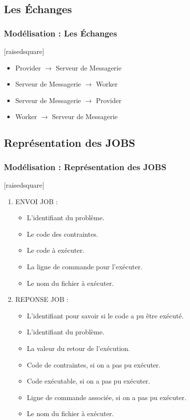 \documentclass[slidetop,11pt]{beamer}
\begin{document}
\subsection[Les Échanges]{Les Échanges}
\begin{frame}[label=echanges]
\frametitle{Modélisation : Les Échanges}

[raisedsquare]
\begin{itemize}
      \item Provider $\rightarrow$ Serveur de Messagerie
      \item Serveur de Messagerie $\rightarrow$ Worker
      \item Serveur de Messagerie $\rightarrow$ Provider
      \item Worker $\rightarrow$ Serveur de Messagerie
\end{itemize}

\end{frame}
\subsection[Représentation des JOBS]{Représentation des JOBS}
\begin{frame}[label=rep_job,fragile]
\frametitle{Modélisation : Représentation des JOBS}
[raisedsquare]
 
\begin{enumerate} \item ENVOI JOB :
\begin{itemize}
\item L'identifiant du problème.
\item Le code des contraintes.
\item Le code à exécuter.
\item La ligne de  commande pour l\textquoteright exécuter.
\item Le nom du fichier à exécuter.
\end{itemize}
\item REPONSE JOB : 
\begin{itemize}
\item L'identifiant pour savoir si le code a pu être exécuté.
\item L'identifiant du problème.
\item La valeur du retour de l\textquoteright exécution.
\item Code de contraintes, si on a pas pu exécuter.
\item Code exécutable, si on a pas pu exécuter.
\item Ligne de commande associée,  si on a pas pu exécuter.
\item Le nom du fichier à exécuter.
\end{itemize}
\end{enumerate}

\end{frame}
\end{document}
